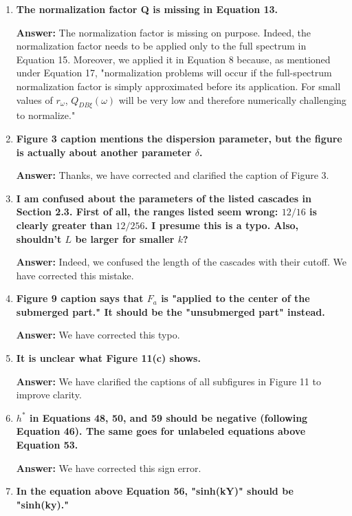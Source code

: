\documentclass{article}
\newcommand{\answer}[1]{\textbf{\textcolor{answercolor}{Answer:}} \textcolor{answercolor}{#1}}
\begin{document}
\begin{enumerate}[label=\textbf{\arabic*.}]
	\item \textbf{The normalization factor Q is missing in Equation 13.}

	      \answer{The normalization factor is missing on purpose. Indeed, the normalization factor needs to be applied only to the full spectrum in Equation 15. Moreover, we applied it in Equation 8 because, as mentioned under Equation 17, "normalization problems will occur if the full-spectrum normalization factor is simply approximated before its application. For small values of $r_{\omega}$, $Q_{DB\xi}(\omega)$ will be very low and therefore numerically challenging to normalize."}

	\item \textbf{Figure 3 caption mentions the dispersion parameter, but the figure is actually about another parameter $\delta$.}

	      \answer{Thanks, we have corrected and clarified the caption of Figure 3.}

	\item \textbf{I am confused about the parameters of the listed cascades in Section 2.3. First of all, the ranges listed seem wrong: $12/16$ is clearly greater than $12/256$. I presume this is a typo. Also, shouldn't $L$ be larger for smaller $k$?}

	      \answer{Indeed, we confused the length of the cascades with their cutoff. We have corrected this mistake.}

	\item \textbf{Figure 9 caption says that $F_a$ is "applied to the center of the submerged part." It should be the "unsubmerged part" instead.}

	      \answer{We have corrected this typo.}

	\item \textbf{It is unclear what Figure 11(c) shows.}

	      \answer{We have clarified the captions of all subfigures in Figure 11 to improve clarity.}

	\item \textbf{$h^*$ in Equations 48, 50, and 59 should be negative (following Equation 46). The same goes for unlabeled equations above Equation 53.}

	      \answer{We have corrected this sign error.}

	\item \textbf{In the equation above Equation 56, "sinh(kY)" should be "sinh(ky)."}


\end{enumerate}
\end{document}
